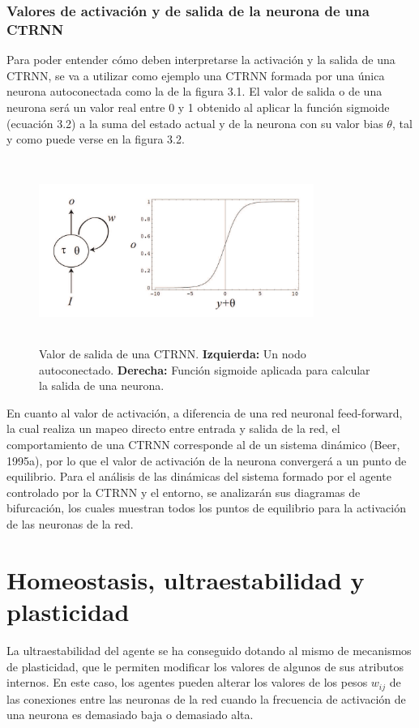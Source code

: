\subsubsection{Valores de activación y de salida de la neurona de una CTRNN}
Para poder entender cómo deben interpretarse la activación y la salida de una CTRNN, se va
a utilizar como ejemplo una CTRNN formada por una única neurona autoconectada como la de la figura 3.1.
El valor de salida o de una neurona será un valor real entre 0 y 1 obtenido al aplicar la función
sigmoide (ecuación 3.2) a la suma del estado actual y de la neurona con su valor bias $\theta$, tal y
como puede verse en la figura 3.2.
\begin{figure}[!h]
    \centering
    \includegraphics[width=0.8\textwidth,height=6cm]{Imagenes/CTRNNBasica}
    \caption{Valor de salida de una CTRNN. \textbf{Izquierda:} Un nodo autoconectado. \textbf{Derecha:} Función sigmoide aplicada para calcular la salida de una neurona.}
    \label{fig:figuraCTRNNBasica}
\end{figure}

En cuanto al valor de activación, a diferencia de una red neuronal feed-forward, la cual realiza
un mapeo directo entre entrada y salida de la red, el comportamiento de una CTRNN corresponde
al de un sistema dinámico (Beer, 1995a), por lo que el valor de activación de la neurona convergerá
a un punto de equilibrio. Para el análisis de las dinámicas del sistema formado por el agente
controlado por la CTRNN y el entorno, se analizarán sus diagramas de bifurcación, los cuales
muestran todos los puntos de equilibrio para la activación de las neuronas de la red.

\section{Homeostasis, ultraestabilidad y plasticidad}
La ultraestabilidad del agente se ha conseguido dotando al mismo de mecanismos de plasticidad, que le permiten modificar los valores de algunos de sus atributos internos. En este caso, los agentes pueden
alterar los valores de los pesos $w_{ij}$ de las conexiones entre las neuronas de la red cuando la frecuencia de activación de una neurona es demasiado baja o demasiado alta.

